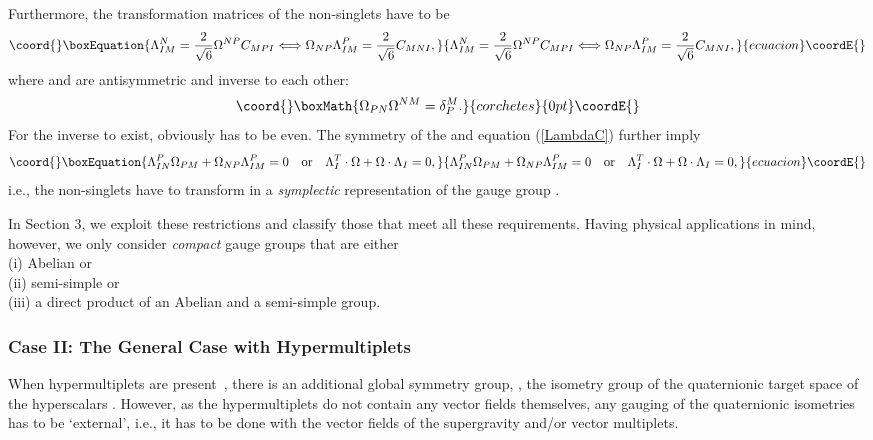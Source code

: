 \documentclass[a4paper,11pt]{article}
\providecommand{\ti}{\ensuremath{\tilde{I}}}
\providecommand{\tj}{\ensuremath{\tilde{J}}}
\providecommand{\tk}{\ensuremath{\tilde{K}}}
\providecommand{\M}{\ensuremath{\mathcal{M}}}
\begin{document}
\begin{itemize}
Furthermore, the transformation matrices \coordHE{} of the
non-singlets have to be
\begin{equation}\coord{}\boxEquation{\label{LambdaC}
\Lambda^N_{IM}=\frac{2}{\sqrt{6}}\Omega^{NP}C_{MPI}\Longleftrightarrow
\Omega_{NP}\Lambda^{P}_{IM}=\frac{2}{\sqrt{6}}C_{MNI},
}{\Lambda^N_{IM}=\frac{2}{\sqrt{6}}\Omega^{NP}C_{MPI}\Longleftrightarrow
\Omega_{NP}\Lambda^{P}_{IM}=\frac{2}{\sqrt{6}}C_{MNI},
}{ecuacion}\coordE{}\end{equation}
where \coordHE{} and \coordHE{} are antisymmetric and
inverse to each other:
\begin{displaymath}\coord{}\boxMath{
\Omega_{PN} \Omega^{NM}=\delta_{P}^{M}.
}{corchetes}{0pt}\coordE{}\end{displaymath}
For the inverse \coordHE{} to exist, \coordHE{} obviously has to
be even. The symmetry of the \coordHE{} and equation (\ref{LambdaC})
further imply
\begin{equation}\coord{}\boxEquation{\label{Lambdasymplectic}
\Lambda^{P}_{IN}\Omega_{PM} +\Omega_{NP}\Lambda^{P}_{IM}=0 \quad
\textrm{or} \quad \Lambda_I^T\cdot\Omega + \Omega\cdot
\Lambda_I=0,
}{\Lambda^{P}_{IN}\Omega_{PM} +\Omega_{NP}\Lambda^{P}_{IM}=0 \quad
\textrm{or} \quad \Lambda_I^T\cdot\Omega + \Omega\cdot
\Lambda_I=0,
}{ecuacion}\coordE{}\end{equation}
i.e., the non-singlets have to transform in a \emph{symplectic}
representation of the gauge group \coordHE{} \cite{GZ1}.
\end{itemize}

In Section 3, we exploit these restrictions and
classify those \myHighlight{$C_{\ti\tj\tk}$}\coordHE{} that meet all these requirements.
Having physical applications in mind, however, we only
consider \emph{compact} gauge groups \coordHE{} that are either \\
(i) Abelian or\\
(ii) semi-simple or \\
(iii) a direct product of an Abelian and a semi-simple group.

\subsubsection{Case II: The General Case with Hypermultiplets}

When hypermultiplets are present~\cite{CD,Sier}, there is an additional
 global symmetry 
group, \myHighlight{$Iso(\M_{Q})$}\coordHE{}, the isometry group of the quaternionic target 
space \myHighlight{$\M_{Q}$}\coordHE{} of 
the hyperscalars \cite{bagwit}.  However, as the hypermultiplets do not 
contain any 
vector fields themselves, any gauging of the quaternionic isometries has 
to be 
`external', i.e., it has to be done  with the vector fields \coordHE{} 
of the 
supergravity and/or vector multiplets.
\end{document}
